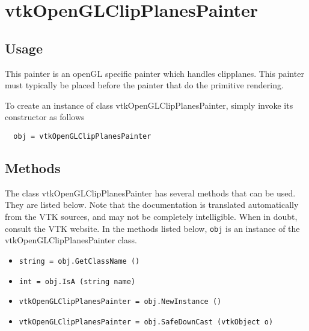\section{vtkOpenGLClipPlanesPainter}

\subsection{Usage}

 This painter is an openGL specific painter which handles clipplanes.
 This painter must typically be placed before the painter that 
 do the primitive rendering.

To create an instance of class vtkOpenGLClipPlanesPainter, simply
invoke its constructor as follows
\begin{verbatim}
  obj = vtkOpenGLClipPlanesPainter
\end{verbatim}
\subsection{Methods}

The class vtkOpenGLClipPlanesPainter has several methods that can be used.
  They are listed below.
Note that the documentation is translated automatically from the VTK sources,
and may not be completely intelligible.  When in doubt, consult the VTK website.
In the methods listed below, \verb|obj| is an instance of the vtkOpenGLClipPlanesPainter class.
\begin{itemize}
\item  \verb|string = obj.GetClassName ()|

\item  \verb|int = obj.IsA (string name)|

\item  \verb|vtkOpenGLClipPlanesPainter = obj.NewInstance ()|

\item  \verb|vtkOpenGLClipPlanesPainter = obj.SafeDownCast (vtkObject o)|

\end{itemize}
